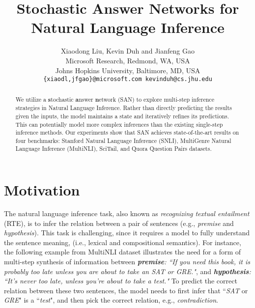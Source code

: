 \documentclass[11pt,a4paper]{article}
\title{Stochastic Answer Networks for Natural Language Inference}
\author{Xiaodong Liu, Kevin Duh and Jianfeng Gao \\
      
  Microsoft Research, Redmond, WA, USA \\
  
  Johns Hopkins University, Baltimore, MD, USA \\
  {\tt \{xiaodl,jfgao\}@microsoft.com
   kevinduh@cs.jhu.edu}
}
\date{}
\begin{document}
\maketitle
\begin{abstract}
We utilize a \textbf{s}tochastic \textbf{a}nswer \textbf{n}etwork (SAN) to explore multi-step inference strategies in Natural Language Inference. Rather than directly predicting the results given the inputs, the model maintains a state and iteratively refines its predictions. This can potentially model more complex inferences than the existing single-step inference methods.
Our experiments show that SAN achieves state-of-the-art results on four benchmarks: Stanford Natural Language Inference (SNLI), MultiGenre Natural Language Inference (MultiNLI), SciTail, and Quora Question Pairs datasets.
\end{abstract}
\section{Motivation}
\label{sec:mot}
The natural language inference task, also known as \textit{recognizing textual entailment} (RTE), is to infer the relation between a pair of sentences (e.g., \textit{premise} and \textit{hypothesis}).
This task is challenging, since it requires a model to fully understand the sentence meaning, (i.e., lexical and compositional semantics). For instance, the following example from MultiNLI dataset \cite{2017arXiv170405426W} illustrates the need for a form of multi-step synthesis of information between \textit{\textbf{premise}: ``If you need this book, it is probably too late unless you are about to take an SAT or GRE."}, and \textit{\textbf{hypothesis}: ``It's never too late, unless you're about to take a test."} To predict the correct relation between these two sentences, the model needs to first infer that ``\textit{SAT} or \textit{GRE}" is a ``\textit{test}", and then pick the correct relation, e.g., \textit{contradiction}. 
\end{document}

